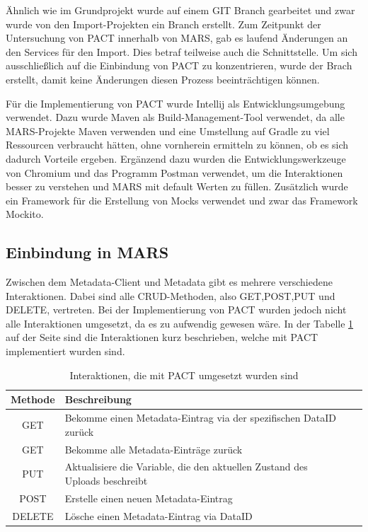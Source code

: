 \documentclass{llncs}
\begin{document}
Ähnlich wie im Grundprojekt wurde auf einem GIT Branch gearbeitet und zwar wurde von den Import-Projekten ein Branch erstellt. Zum Zeitpunkt der Untersuchung von PACT innerhalb von MARS, gab es laufend Änderungen an den Services für den Import. Dies betraf teilweise auch die Schnittstelle. Um sich ausschließlich auf die Einbindung von PACT zu konzentrieren, wurde der Brach erstellt, damit keine Änderungen diesen Prozess beeinträchtigen können.

Für die Implementierung von PACT wurde Intellij als Entwicklungsumgebung verwendet. Dazu wurde Maven als Build-Management-Tool verwendet, da alle MARS-Projekte Maven verwenden und eine Umstellung auf Gradle zu viel Ressourcen verbraucht hätten, ohne vornherein ermitteln zu können, ob es sich dadurch Vorteile ergeben. Ergänzend dazu wurden die Entwicklungswerkzeuge von Chromium und das Programm Postman verwendet, um die Interaktionen besser zu verstehen und MARS mit default Werten zu füllen. Zusätzlich wurde ein Framework für die Erstellung von Mocks verwendet und zwar das Framework Mockito.

\subsection{Einbindung in MARS}
Zwischen dem Metadata-Client und Metadata gibt es mehrere verschiedene Interaktionen. Dabei sind alle CRUD-Methoden, also GET,POST,PUT und DELETE, vertreten. Bei der Implementierung von PACT wurden jedoch nicht alle Interaktionen umgesetzt, da es zu aufwendig gewesen wäre. In der Tabelle \ref{tab:Interaktionen_PACT} auf der Seite \pageref{tab:Interaktionen_PACT} sind die Interaktionen kurz beschrieben, welche mit PACT implementiert wurden sind.

\begin{table}[htbp]
\centering
\begin{tabular}{|c|l|p{4cm}|p{4cm}|}
\hline
\multicolumn{1}{|l|}{Methode} & Beschreibung \\ \hline
GET & Bekomme einen Metadata-Eintrag via der spezifischen DataID zurück\\ \hline
GET & Bekomme alle Metadata-Einträge zurück \\ \hline
PUT & Aktualisiere die Variable, die den aktuellen Zustand des Uploads beschreibt \\ \hline
POST & Erstelle einen neuen Metadata-Eintrag \\ \hline
DELETE & Lösche einen Metadata-Eintrag via DataID\\ \hline
\end{tabular}
\caption{Interaktionen, die mit PACT umgesetzt wurden sind}
\label{tab:Interaktionen_PACT}
\end{table}
\end{document}
